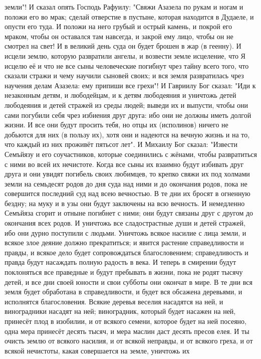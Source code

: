 земли"!
И сказал опять Господь Рафуилу: "Свяжи Азазела по рукам и ногам и
положи его во мрак; сделай отверстие в пустыне, которая находится в Дудаеле, и
опусти его туда.
И положи на него грубый и острый камень, и покрой его мраком, чтобы
он оставался там навсегда, и закрой ему лицо, чтобы он не смотрел на свет!
И в великий день суда он будет брошен в жар (в геенну).
И исцели землю, которую развратили ангелы, и возвести земле
исцеление, что Я исцелю её и что не все сыны человеческие погибнут чрез тайну
всего того, что сказали стражи и чему научили сыновей своих; и вся земля
развратилась чрез научения делам Азазела: ему припиши все грехи"!
И Гавриилу Бог сказал: "Иди к незаконным детям, и любодейцам, и к
детям любодеяния и уничтожь детей любодеяния и детей стражей из среды людей;
выведи их и выпусти, чтобы они сами погубили себя чрез избиения друг друга:
ибо они не должны иметь долгой жизни.
И  все они будут просить тебя, но отцы их (исполинов) ничего не
добьются для них (в пользу их), хотя они и надеются на вечную жизнь и на то,
что каждый из них проживёт пятьсот лет".
И Михаилу Бог сказал: "Извести Семъйязу и его соучастников, которые
соединились с жёнами, чтобы развратиться с ними во всей их нечистоте.
Когда все сыны их взаимно будут избивать друг друга и они увидят
погибель своих любимцев, то крепко свяжи их под холмами земли на семьдесят
родов до дня суда над ними и до окончания родов, пока не совершится последний
суд над всею вечностью.
В те дни их бросят в огненную бездну; на муку и в узы они будут
заключены на всю вечность.
И немедленно Семъйяза сгорит и отныне погибнет с ними; они будут
связаны друг с другом до окончания всех родов.
И уничтожь все сладострастные души и детей стражей, ибо они дурно
поступили с людьми.
Уничтожь всякое насилие с лица земли, и всякое злое деяние должно
прекратиться; и явится растение справедливости и правды, и всякое дело будет
сопровождаться благословением; справедливость и правда будут насаждать полную
радость в века.
И теперь в смирении будут поклоняться все праведные и будут пребывать
в жизни, пока не родят тысячу детей, и все дни своей юности и свои субботы они
окончат в мире.
В те дни вся земля будет обработана в справедливости, и будет вся
обсажена деревьями, и исполнятся благословения.
Всякие деревья веселия насадятся на ней, и виноградники насадят на
ней; виноградник, который будет насажен на ней, принесёт плод в изобилии, и от
всякого семени, которое будет на ней посеяно, одна мера принесёт десять тысяч,
и мера маслин даст десять пресов елея.
И ты очисть землю от всякого насилия, и от всякой неправды, и от
всякого греха, и от всякой нечистоты, какая совершается на земле, уничтожь их
